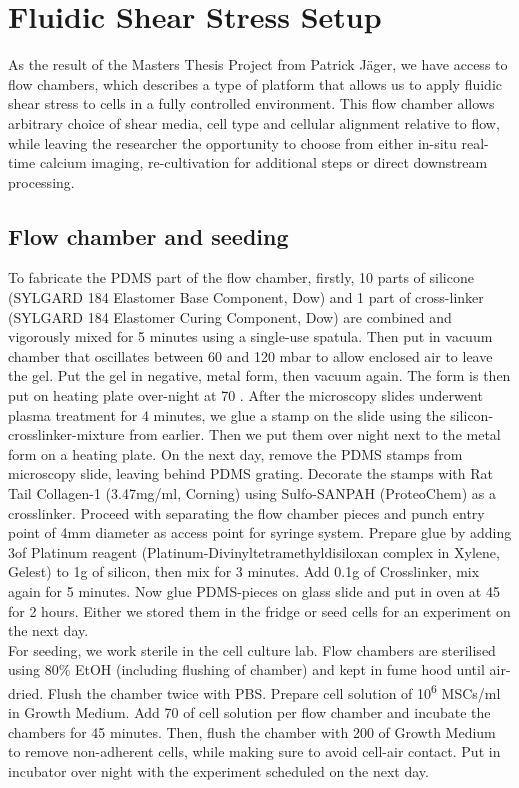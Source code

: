 \section{Fluidic Shear Stress Setup}
As the result of the Masters Thesis Project from Patrick Jäger, we have access to flow chambers, which describes a type of platform that allows us to apply fluidic shear stress to cells in a fully controlled environment. This flow chamber allows arbitrary choice of shear media, cell type and cellular alignment relative to flow, while leaving the researcher the opportunity to choose from either in-situ real-time calcium imaging, re-cultivation for additional steps or direct downstream processing.

\subsection{Flow chamber and seeding}
\label{sec:FluidicModel}
To fabricate the PDMS part of the flow chamber, firstly, 10 parts of silicone (SYLGARD\texttrademark{} 184 Elastomer Base Component, Dow) and 1 part of cross-linker (SYLGARD\texttrademark{} 184 Elastomer Curing Component, Dow) are combined and vigorously mixed for 5 minutes using a single-use spatula. Then put in vacuum chamber that oscillates between 60 and 120 mbar to allow enclosed air to leave the gel. Put the gel in negative, metal form, then vacuum again. The form is then put on heating plate over-night at 70 \degC{}. After the microscopy slides underwent plasma treatment for 4 minutes, we glue a stamp on the slide using the silicon-crosslinker-mixture from earlier. Then we put them over night next to the metal form on a heating plate. On the next day, remove the PDMS stamps from microscopy slide, leaving behind PDMS grating. Decorate the stamps with Rat Tail Collagen-1 (3.47mg/ml, Corning) using Sulfo-SANPAH (ProteoChem) as a crosslinker. Proceed with separating the flow chamber pieces and punch entry point of 4mm diameter as access point for syringe system. Prepare glue by adding 3\mul of Platinum reagent (Platinum-Divinyltetramethyldisiloxan complex in Xylene, Gelest) to 1g of silicon, then mix for 3 minutes. Add 0.1g of Crosslinker, mix again for 5 minutes. Now glue PDMS-pieces on glass slide and put in oven at 45 \degC{} for 2 hours. Either we stored them in the fridge or seed cells for an experiment on the next day.\\
For seeding, we work sterile in the cell culture lab. Flow chambers are sterilised using 80\% EtOH (including flushing of chamber) and kept in fume hood until air-dried. Flush the chamber twice with PBS. Prepare cell solution of 10\textsuperscript{6} MSCs/ml in Growth Medium. Add 70 \mul{} of cell solution per flow chamber and incubate the chambers for 45 minutes. Then, flush the chamber with 200\mul{} of Growth Medium to remove non-adherent cells, while making sure to avoid cell-air contact. Put in incubator over night with the experiment scheduled on the next day.\\

